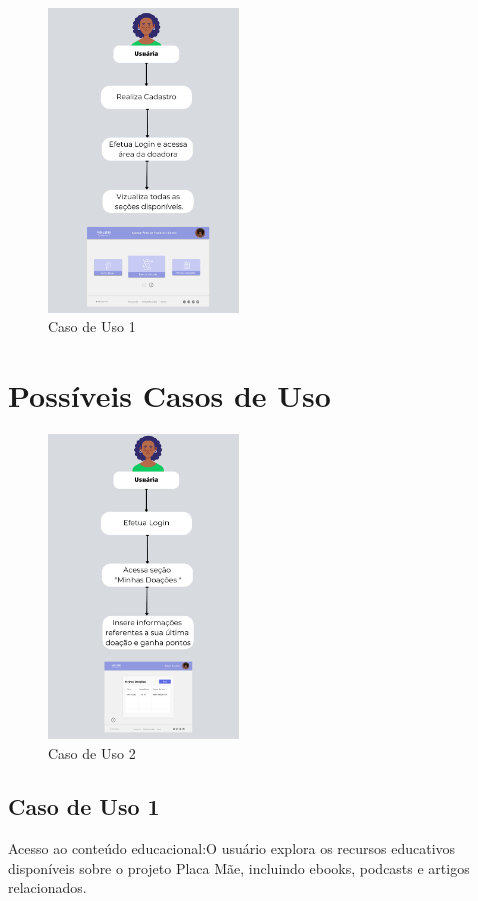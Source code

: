 \begin{figure}[h!]
    \centering
    \includegraphics[width=0.45\textwidth]{Figuras/cs1.pdf}
    \caption{Caso de Uso 1}
    \label{fig:cs1}
\end{figure} 

\section{Possíveis Casos de Uso}

\begin{figure}[h!]
    \centering
    \includegraphics[width=0.45\textwidth]{Figuras/cs2.pdf}
    \caption{Caso de Uso 2}
    \label{fig:cs2}
\end{figure}

\subsection{Caso de Uso 1}
Acesso ao conteúdo educacional:O usuário explora os recursos educativos disponíveis sobre o projeto Placa Mãe, incluindo ebooks, podcasts e artigos relacionados.


